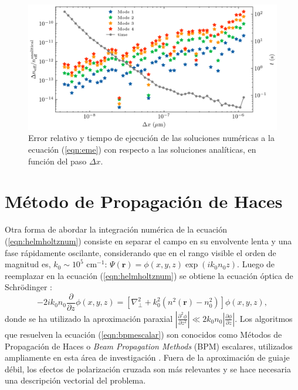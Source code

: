 \begin{figure}[H]
	\centering
	\includegraphics[width=\linewidth]{media/numerical_slab}
	\caption[Error relativo y tiempo de ejecución.]{Error relativo y tiempo de ejecución de las soluciones numéricas a la ecuación (\ref{eqn:eme}) con respecto a las soluciones analíticas, en función del paso $\Delta x$. \label{fig:emenumerror}}
\end{figure}
\section{Método de Propagación de Haces} 
Otra forma de abordar la integración numérica de la ecuación (\ref{eqn:helmholtznum}) consiste en separar el campo en su envolvente lenta y una fase rápidamente oscilante, considerando que en el rango visible el orden de magnitud es, $k_0 \sim 10 ^{5} \text{ cm}^{-1}$: $\Psi(\textbf{r}) = \phi(x,y,z)\exp(ik_0 n_0 z)$. Luego de reemplazar en la ecuación (\ref{eqn:helmholtznum}) se obtiene la ecuación óptica de Schrödinger \citep{paraxialschrodinger}:
\begin{equation}
	-2ik_0 n_0\frac{\partial }{\partial z}\phi(x,y, z) =  \left[\nabla_\perp^2 + k_0^2 (n^2(\textbf{r})-n_0^2)\right]\phi(x,y, z), \label{eqn:bpmescalar}
\end{equation} 
donde se ha utilizado la aproximación paraxial $\left| \frac{\partial^2 \phi}{\partial z^2} \right| \ll 2 k_0 n_0\left| \frac{\partial \phi}{\partial z} \right|$. Los algoritmos que resuelven la ecuación (\ref{eqn:bpmescalar}) son conocidos como Métodos de Propagación de Haces o \textit{Beam Propagation Methods} (BPM) escalares, utilizados ampliamente en esta área de investigación \cite{bics, interorbital, OAMCaging, vortex, bpm}. Fuera de la aproximación de guiaje débil, los efectos de polarización cruzada son más relevantes y se hace necesaria una descripción vectorial del problema.
